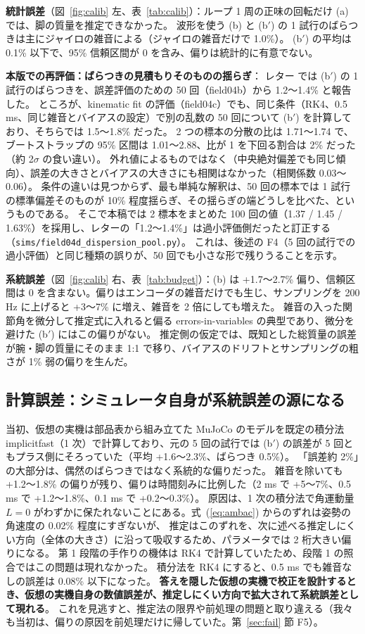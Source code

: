 \documentclass[paper=a4paper,fontsize=10pt,twocolumn,column_gap=2zw,line_length=24zw,number_of_lines=46,head_space=20mm]{jlreq}
\begin{document}
\textbf{統計誤差}（図~\ref{fig:calib} 左、表~\ref{tab:calib}）：ループ 1 周の正味の回転だけ (a) では、脚の質量を推定できなかった。
波形を使う (b) と (b$'$) の 1 試行のばらつきは主にジャイロの雑音による（ジャイロの雑音だけで 1.0\%）。
(b$'$) の平均は 0.1\% 以下で、95\% 信頼区間が 0 を含み、偏りは統計的に有意でない。

\textbf{本版での再評価：ばらつきの見積もりそのものの揺らぎ}：
レター \cite{letter2026} では (b$'$) の 1 試行のばらつきを、誤差評価のための 50 回（field04b）から 1.2〜1.4\% と報告した。
ところが、kinematic fit の評価（field04c）でも、同じ条件（RK4、0.5 ms、同じ雑音とバイアスの設定）で別の乱数の 50 回について (b$'$) を計算しており、そちらでは 1.5〜1.8\% だった。
2 つの標本の分散の比は 1.71〜1.74 で、ブートストラップの 95\% 区間は 1.01〜2.88、比が 1 を下回る割合は 2\% だった（約 2$\sigma$ の食い違い）。
外れ値によるものではなく（中央絶対偏差でも同じ傾向）、誤差の大きさとバイアスの大きさにも相関はなかった（相関係数 0.03〜0.06）。
条件の違いは見つからず、最も単純な解釈は、50 回の標本では 1 試行の標準偏差そのものが 10\% 程度揺らぎ、その揺らぎの端どうしを比べた、というものである。
そこで本稿では 2 標本をまとめた 100 回の値（1.37 / 1.45 / 1.63\%）を採用し、レターの「1.2〜1.4\%」は過小評価側だったと訂正する（\texttt{sims/field04d\_dispersion\_pool.py}）。
これは、後述の F4（5 回の試行での過小評価）と同じ種類の誤りが、50 回でも小さな形で残りうることを示す。

\textbf{系統誤差}（図~\ref{fig:calib} 右、表~\ref{tab:budget}）：(b) は +1.7〜2.7\% 偏り、信頼区間は 0 を含まない。偏りはエンコーダの雑音だけでも生じ、サンプリングを 200 Hz に上げると +3〜7\% に増え、雑音を 2 倍にしても増えた。
雑音の入った関節角を微分して推定式に入れると偏る errors-in-variables の典型であり、微分を避けた (b$'$) にはこの偏りがない。
推定側の仮定では、既知とした総質量の誤差が腕・脚の質量にそのまま 1:1 で移り、バイアスのドリフトとサンプリングの粗さが 1\% 弱の偏りを生んだ。

\subsection{計算誤差：シミュレータ自身が系統誤差の源になる}
当初、仮想の実機は部品表から組み立てた MuJoCo のモデルを既定の積分法 implicitfast（1 次）で計算しており、元の 5 回の試行では (b$'$) の誤差が 5 回ともプラス側にそろっていた（平均 +1.6〜2.3\%、ばらつき 0.5\%）。
「誤差約 2\%」の大部分は、偶然のばらつきではなく系統的な偏りだった。
雑音を除いても +1.2〜1.8\% の偏りが残り、偏りは時間刻みに比例した（2 ms で +5〜7\%、0.5 ms で +1.2〜1.8\%、0.1 ms で +0.2〜0.3\%）。
原因は、1 次の積分法で角運動量 $L=0$ がわずかに保たれないことにある。式~(\ref{eq:ambac}) からのずれは姿勢の角速度の 0.02\% 程度にすぎないが、
推定はこのずれを、次に述べる推定しにくい方向（全体の大きさ）に沿って吸収するため、パラメータでは 2 桁大きい偏りになる。
第 1 段階の手作りの機体は RK4 で計算していたため、段階 1 の照合ではこの問題は現れなかった。
積分法を RK4 にすると、0.5 ms でも雑音なしの誤差は 0.08\% 以下になった。
\textbf{答えを隠した仮想の実機で校正を設計するとき、仮想の実機自身の数値誤差が、推定しにくい方向で拡大されて系統誤差として現れる}。
これを見逃すと、推定法の限界や前処理の問題と取り違える（我々も当初は、偏りの原因を前処理だけに帰していた。第~\ref{sec:fail} 節 F5）。
\end{document}
